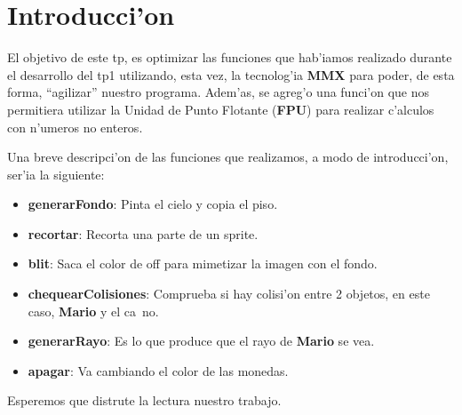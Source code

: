 \section{Introducci'on}

El objetivo de este tp, es optimizar las funciones que hab'iamos realizado
durante el desarrollo del tp1 utilizando, esta vez, la tecnolog'ia \textbf{MMX}
para poder, de esta forma, ``agilizar'' nuestro programa. Adem'as, se agreg'o
una funci'on que nos permitiera utilizar la Unidad de Punto Flotante
(\textbf{FPU}) para realizar c'alculos con n'umeros no enteros. 

Una breve descripci'on de las funciones que realizamos, a modo de
introducci'on, ser'ia la siguiente:

\begin{itemize}
	\item \textbf{generarFondo}: Pinta el cielo y copia el piso.
	\item \textbf{recortar}: Recorta una parte de un sprite.
	\item \textbf{blit}: Saca el color de off para mimetizar la imagen con el fondo.
	\item \textbf{chequearColisiones}: Comprueba si hay colisi'on entre 2 objetos, en este
caso, \textbf{Mario} y el ca~no.
	\item \textbf{generarRayo}: Es lo que produce que el rayo de \textbf{Mario}
se vea.
	\item \textbf{apagar}: Va cambiando el color de las monedas.
\end{itemize}

Esperemos que distrute la lectura nuestro trabajo.

